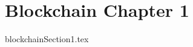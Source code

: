 \documentclass[class=report , crop=false, openany, titlepage, twoside, multi={itemize, figure, verbatim}, float=false]{standalone}
\title{}  %
\begin{document}
\ifstandalone
\maketitle %
\clearpage
\tableofcontents %
\clearpage
\fi

\chapter{Blockchain Chapter 1}
{blockchainSection1.tex}
\clearpage
\end{document}

